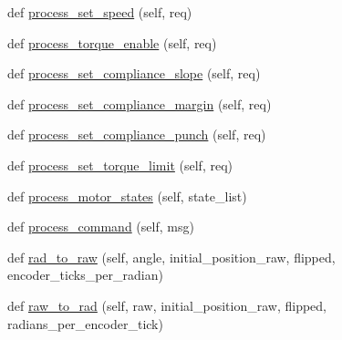 \begin{DoxyCompactItemize}
\item 
def \hyperlink{classdynamixel__controllers_1_1joint__controller_1_1_joint_controller_a97af096c1566307859ed168c900fa8a6}{process\+\_\+set\+\_\+speed} (self, req)
\item 
def \hyperlink{classdynamixel__controllers_1_1joint__controller_1_1_joint_controller_a2181fcf467234ed09e378a93ea5a0553}{process\+\_\+torque\+\_\+enable} (self, req)
\item 
def \hyperlink{classdynamixel__controllers_1_1joint__controller_1_1_joint_controller_a6390c0c20afc0581dd3b1122c894d175}{process\+\_\+set\+\_\+compliance\+\_\+slope} (self, req)
\item 
def \hyperlink{classdynamixel__controllers_1_1joint__controller_1_1_joint_controller_aed0bae387958b56f88fd707e9da9e8f1}{process\+\_\+set\+\_\+compliance\+\_\+margin} (self, req)
\item 
def \hyperlink{classdynamixel__controllers_1_1joint__controller_1_1_joint_controller_ac3d7aea8d47f24ab10c1162f34cce44f}{process\+\_\+set\+\_\+compliance\+\_\+punch} (self, req)
\item 
def \hyperlink{classdynamixel__controllers_1_1joint__controller_1_1_joint_controller_aa199ce6ae353ed44fe71ae96a5da242d}{process\+\_\+set\+\_\+torque\+\_\+limit} (self, req)
\item 
def \hyperlink{classdynamixel__controllers_1_1joint__controller_1_1_joint_controller_a7b36f4224a915d218cad650fca286e1f}{process\+\_\+motor\+\_\+states} (self, state\+\_\+list)
\item 
def \hyperlink{classdynamixel__controllers_1_1joint__controller_1_1_joint_controller_add0def20d027305a745377665f331108}{process\+\_\+command} (self, msg)
\item 
def \hyperlink{classdynamixel__controllers_1_1joint__controller_1_1_joint_controller_aea21e76e178029b31cd40b3e0335b621}{rad\+\_\+to\+\_\+raw} (self, angle, initial\+\_\+position\+\_\+raw, flipped, encoder\+\_\+ticks\+\_\+per\+\_\+radian)
\item 
def \hyperlink{classdynamixel__controllers_1_1joint__controller_1_1_joint_controller_a58a58e669c2918d00cc358f2b58d061c}{raw\+\_\+to\+\_\+rad} (self, raw, initial\+\_\+position\+\_\+raw, flipped, radians\+\_\+per\+\_\+encoder\+\_\+tick)
\end{DoxyCompactItemize}
